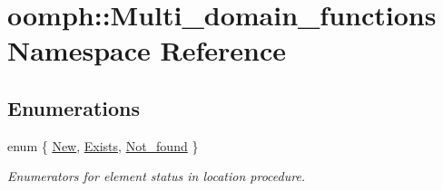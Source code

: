 \hypertarget{namespaceoomph_1_1Multi__domain__functions}{}\section{oomph\+:\+:Multi\+\_\+domain\+\_\+functions Namespace Reference}
\label{namespaceoomph_1_1Multi__domain__functions}
\subsection*{Enumerations}
\begin{DoxyCompactItemize}
\item 
enum \{ \hyperlink{namespaceoomph_1_1Multi__domain__functions_a82a287ab8a3bad9e68edc3437d9dbfb8a4effe7dd231a015f6e120c3f2d4fdd55}{New}, 
\hyperlink{namespaceoomph_1_1Multi__domain__functions_a82a287ab8a3bad9e68edc3437d9dbfb8ae79558bf4c6d5520127c346350aa1ecd}{Exists}, 
\hyperlink{namespaceoomph_1_1Multi__domain__functions_a82a287ab8a3bad9e68edc3437d9dbfb8abf3c04eff4fec3f0659fac92a035aed9}{Not\+\_\+found}
 \}\begin{DoxyCompactList}\small\item\em Enumerators for element status in location procedure. \end{DoxyCompactList}
\end{DoxyCompactItemize}
